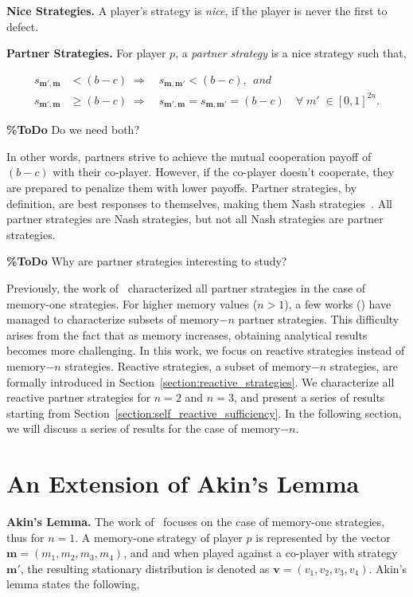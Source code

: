 \documentclass{article}
\theoremstyle{definition}
\begin{document}
{\bf Nice Strategies.} A player's strategy is \textit{nice}, if the player is
never the first to defect.

{\bf Partner Strategies.} For player $p$, a \textit{partner strategy} is a nice
strategy such that,

\begin{align}\label{Eq:Partner}
    s_{\mathbf{m'},\mathbf{m}} & < (b - c) \; \Rightarrow \quad s_{\mathbf{m},\mathbf{m'}} < (b - c), ~~and~~\\
    s_{\mathbf{m'},\mathbf{m}} & \geq (b - c) \; \Rightarrow \quad s_{\mathbf{m'},\mathbf{m}} = s_{\mathbf{m},\mathbf{m'}} = (b - c) \quad \forall \; m' \; \in [0, 1]^{2n}.
\end{align}

{\bf \%ToDo} Do we need both?

In other words, partners strive to achieve the mutual cooperation payoff of $(b -
c)$ with their co-player. However, if the co-player doesn't cooperate, they are
prepared to penalize them with lower payoffs. Partner strategies, by definition,
are best responses to themselves, making them Nash strategies~\citep{Hilbe:GEB:2015}.
All partner strategies are Nash strategies, but not all Nash strategies
are partner strategies.

{\bf \%ToDo} Why are partner strategies interesting to study?

Previously, the work of~\citep{akin:EGADS:2016} characterized all partner strategies in the
case of memory-one strategies. For higher memory values ($n > 1$), a few works
(\citep{hilbe:PNAS:2017}) have managed to characterize subsets of memory$-n$ partner
strategies. This difficulty arises from the fact that as memory increases,
obtaining analytical results becomes more challenging. In this work, we focus on
reactive strategies instead of memory$-n$ strategies. Reactive strategies, a
subset of memory$-n$ strategies, are formally introduced in Section~\ref{section:reactive_strategies}. We
characterize all reactive partner strategies for $n = 2$ and $n = 3$, and present a
series of results starting from Section~\ref{section:self_reactive_sufficiency}. In the following section, we will
discuss a series of results for the case of memory$-n$.

\section{An Extension of Akin's Lemma}

\textbf{Akin's Lemma.} The work of~\citep{akin:EGADS:2016} focuses on the case of
memory-one strategies, thus for $n=1$. A memory-one strategy of player $p$ is
represented by the vector $\mathbf{m} = (m_1, m_2, m_3, m_4)$, and and when
played against a co-player with strategy $\mathbf{m}'$, the resulting stationary
distribution is denoted as $\mathbf{v} = (v_1, v_2, v_3, v_4)$. Akin's lemma
states the following,
\end{document}
